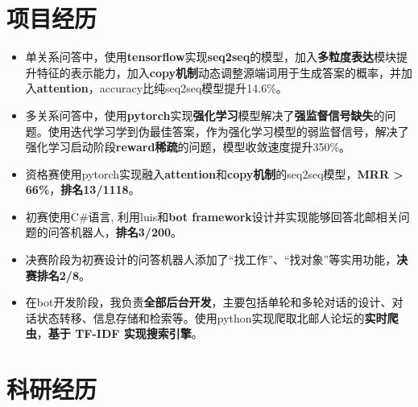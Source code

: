 \documentclass[11pt,a4paper]{moderncv}
\begin{document}
\section{项目经历}
{
\begin{itemize}
\item 单关系问答中，使用\textbf{tensorflow}实现\textbf{seq2seq}的模型，加入\textbf{多粒度表达}模块提升特征的表示能力，加入\textbf{copy机制}动态调整源端词用于生成答案的概率，并加入\textbf{attention}，accuracy比纯seq2seq模型提升14.6\%。%
\item 多关系问答中，使用\textbf{pytorch}实现\textbf{强化学习}模型解决了\textbf{强监督信号缺失}的问题。使用迭代学习学到伪最佳答案，作为强化学习模型的弱监督信号，解决了强化学习启动阶段\textbf{reward稀疏}的问题，模型收敛速度提升350\%。
\end{itemize}}

{
\begin{itemize}
\item 资格赛使用pytorch实现融入\textbf{attention}和\textbf{copy机制}的seq2seq模型，\textbf{MRR > 66\%}，\textbf{排名13/1118}。
\item 初赛使用C\#语言, 利用luis和\textbf{bot framework}设计并实现能够回答北邮相关问题的问答机器人，\textbf{排名3/200}。
\item 决赛阶段为初赛设计的问答机器人添加了“找工作”、“找对象”等实用功能，\textbf{决赛排名2/8}。
\item 在bot开发阶段，我负责\textbf{全部后台开发}，主要包括单轮和多轮对话的设计、对话状态转移、信息存储和检索等。使用python实现爬取北邮人论坛的\textbf{实时爬虫}，\textbf{基于 TF-IDF 实现搜索引擎}。
\end{itemize}}

\section{科研经历}
\end{document}
